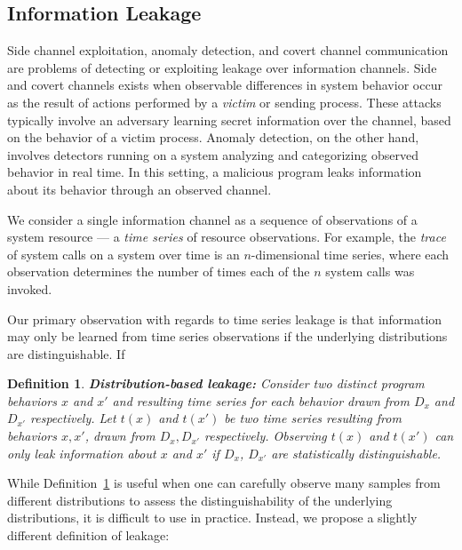 \documentclass[a4paper]{article}
\newtheorem{definition}{Definition}
\begin{document}
\subsection{Information Leakage}
\label{subsec:information_leakage}
Side channel exploitation, anomaly detection, and covert channel communication are problems of detecting or exploiting leakage over information channels.
Side and covert channels exists when observable differences in system behavior occur as the result of actions performed by a \textit{victim} or sending process.
These attacks typically involve an adversary learning secret information over the channel, based on the behavior of a victim process.
Anomaly detection, on the other hand, involves detectors running on a system analyzing and categorizing observed behavior in real time.
In this setting, a malicious program leaks information about its behavior through an observed channel.

We consider a single information channel as a sequence of observations of a system resource --- a \textit{time series} of resource observations.
For example, the \textit{trace} of system calls on a system over time is an $n$-dimensional time series, where each observation determines the number of times each of the $n$ system calls was invoked.

Our primary observation with regards to time series leakage is that information may only be learned from time series observations if the underlying distributions are distinguishable.
If  

\begin{definition}\label{defn:dist_leakage}
    \textbf{Distribution-based leakage:} Consider two distinct program behaviors $x$ and $x'$ and resulting time series for each behavior drawn from $D_x$ and $D_{x'}$ respectively.
    Let $t(x)$ and $t(x')$ be two time series resulting from behaviors $x, x'$, drawn from $D_x, D_{x'}$ respectively.
    Observing $t(x)$ and $t(x')$ can only leak information about $x$ and $x'$ if $D_x$, $D_{x'}$ are statistically distinguishable.
\end{definition}

While Definition~\ref{defn:dist_leakage} is useful when one can carefully observe many samples from different distributions to assess the distinguishability of the underlying distributions, it is difficult to use in practice.
Instead, we propose a slightly different definition of leakage:
\end{document}

